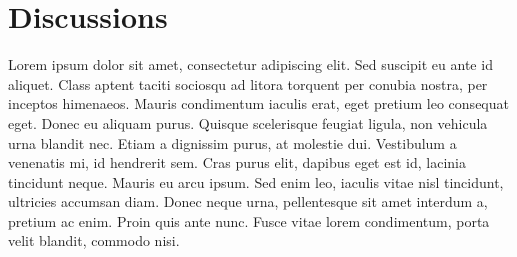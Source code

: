 \section{Discussions}

Lorem ipsum dolor sit amet, consectetur adipiscing elit. Sed suscipit eu ante id aliquet. Class aptent taciti sociosqu ad litora torquent per conubia nostra, per inceptos himenaeos. Mauris condimentum iaculis erat, eget pretium leo consequat eget. Donec eu aliquam purus. Quisque scelerisque feugiat ligula, non vehicula urna blandit nec. Etiam a dignissim purus, at molestie dui. Vestibulum a venenatis mi, id hendrerit sem. Cras purus elit, dapibus eget est id, lacinia tincidunt neque. Mauris eu arcu ipsum. Sed enim leo, iaculis vitae nisl tincidunt, ultricies accumsan diam. Donec neque urna, pellentesque sit amet interdum a, pretium ac enim. Proin quis ante nunc. Fusce vitae lorem condimentum, porta velit blandit, commodo nisi.
